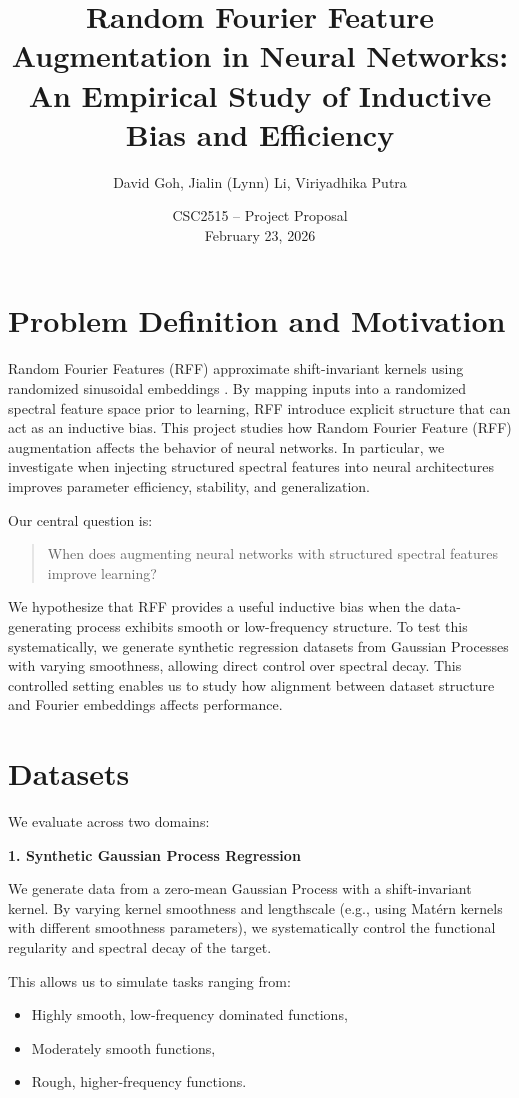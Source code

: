 \documentclass[11pt]{article}
\title{Random Fourier Feature Augmentation in Neural Networks:\\
An Empirical Study of Inductive Bias and Efficiency}
\author{David Goh, Jialin (Lynn) Li, Viriyadhika Putra}
\date{CSC2515 -- Project Proposal \\ February 23, 2026}
\begin{document}
\maketitle

\section{Problem Definition and Motivation}

Random Fourier Features (RFF) approximate shift-invariant kernels using randomized sinusoidal embeddings \cite{rahimi2007}. By mapping inputs into a randomized spectral feature space prior to learning, RFF introduce explicit structure that can act as an inductive bias. This project studies how Random Fourier Feature (RFF) augmentation affects the behavior of neural networks. In particular, we investigate when injecting structured spectral features into neural architectures improves parameter efficiency, stability, and generalization.

Our central question is:

\begin{quote}
When does augmenting neural networks with structured spectral features improve learning?
\end{quote}

We hypothesize that RFF provides a useful inductive bias when the data-generating process exhibits smooth or low-frequency structure. To test this systematically, we generate synthetic regression datasets from Gaussian Processes with varying smoothness, allowing direct control over spectral decay. This controlled setting enables us to study how alignment between dataset structure and Fourier embeddings affects performance.

\section{Datasets}

We evaluate across two domains:

\textbf{1. Synthetic Gaussian Process Regression}

We generate data from a zero-mean Gaussian Process with a shift-invariant kernel. By varying kernel smoothness and lengthscale (e.g., using Matérn kernels with different smoothness parameters), we systematically control the functional regularity and spectral decay of the target.

This allows us to simulate tasks ranging from:
\begin{itemize}
    \item Highly smooth, low-frequency dominated functions,
    \item Moderately smooth functions,
    \item Rough, higher-frequency functions.
\end{itemize}
\end{document}
